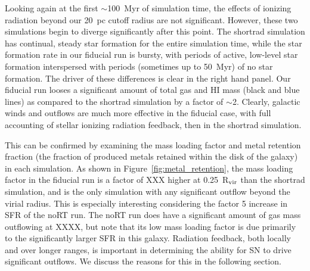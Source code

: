 \documentclass[twocolumn]{aastex62}
\begin{document}
Looking again at the first $\sim$100~Myr of simulation time, the effects of ionizing radiation beyond our 20~pc cutoff radius are not significant. However, these two simulations begin to diverge significantly after this point. The shortrad simulation has continual, steady star formation for the entire simulation time, while the star formation rate in our fiducial run is bursty, with periods of active, low-level star formation interspersed with periods (sometimes up to 50~Myr) of no star formation. The driver of these differences is clear in the right hand panel. Our fiducial run looses a significant amount of total gas and HI mass (black and blue lines) as compared to the shortrad simulation by a factor of $\sim$2. Clearly, galactic winds and outflows are much more effective in the fiducial case, with full accounting of stellar ionizing radiation feedback, then in the shortrad simulation.

This can be confirmed by examining the mass loading factor and metal retention fraction (the fraction of produced metals retained within the disk of the galaxy) in each simulation. As shown in Figure~\ref{fig:metal_retention}, the mass loading factor in the fiducial run is a factor of XXX higher at 0.25~R$_{\rm vir}$ than the shortrad simulation, and is the only simulation with any significant outflow beyond the virial radius. This is especially interesting considering the factor 5 increase in SFR of the noRT run. The noRT run does have a significant amount of gas mass outflowing at XXXX, but note that its low mass loading factor is due primarily to the significantly larger SFR in this galaxy. Radiation feedback, both locally and over longer ranges, is important in determining the ability for SN to drive significant outflows. We discuss the reasons for this in the following section.
\end{document}
